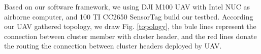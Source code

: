 Based on our software framework, we using DJI M100 UAV with Intel NUC as airborne computer, and 100 TI CC2650 SensorTag build our testbed. According our UAV gathered topology, we draw Fig. \ref{topology}, the bule lines represent the connection between cluster member with cluster header, and the red lines donate the routing the connection between cluster headers deployed by UAV.